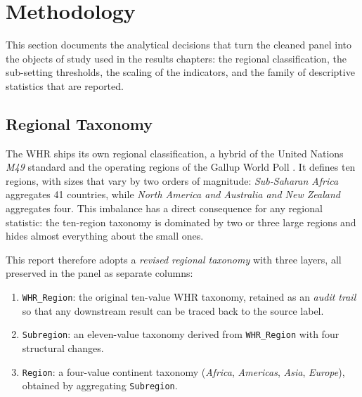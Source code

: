 
\section{Methodology}
\label{sec:methodology}

This section documents the analytical decisions that turn the cleaned panel into the objects of study used in the results chapters: the regional classification, the sub-setting thresholds, the scaling of the indicators, and the family of descriptive statistics that are reported.

\subsection{Regional Taxonomy}
\label{sec:methodology-taxonomy}

The WHR ships its own regional classification, a hybrid of the United Nations \emph{M49} standard \parencite{un_m49} and the operating regions of the Gallup World Poll \parencite{gallup_world_poll}. It defines ten regions, with sizes that vary by two orders of magnitude: \emph{Sub-Saharan Africa} aggregates 41 countries, while \emph{North America and Australia and New Zealand} aggregates four. This imbalance has a direct consequence for any regional statistic: the ten-region taxonomy is dominated by two or three large regions and hides almost everything about the small ones.

This report therefore adopts a \emph{revised regional taxonomy} with three layers, all preserved in the panel as separate columns:
\begin{enumerate}
	\item \texttt{WHR\_Region}: the original ten-value WHR taxonomy, retained as an \emph{audit trail} so that any downstream result can be traced back to the source label.
	\item \texttt{Subregion}: an eleven-value taxonomy derived from \texttt{WHR\_Region} with four structural changes.
	\item \texttt{Region}: a four-value continent taxonomy (\emph{Africa}, \emph{Americas}, \emph{Asia}, \emph{Europe}), obtained by aggregating \texttt{Subregion}.
\end{enumerate}

